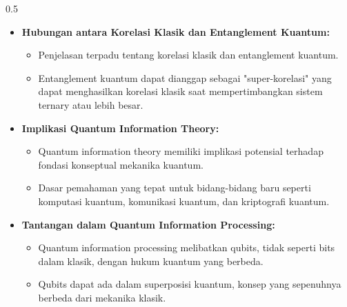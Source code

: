 \begin{frame}
\begin{columns}[T]
   \begin{column}{0.5\textwidth}
        \begin{itemize}\tiny \justifying
            \item \textbf{Hubungan antara Korelasi Klasik dan Entanglement Kuantum:}
            \begin{itemize}\tiny \justifying
            \item Penjelasan terpadu tentang korelasi klasik dan entanglement kuantum.
            \item Entanglement kuantum dapat dianggap sebagai "super-korelasi" yang dapat menghasilkan korelasi klasik saat mempertimbangkan sistem ternary atau lebih besar.
            \end{itemize}
            
            \item \textbf{Implikasi Quantum Information Theory:}
            \begin{itemize}\tiny \justifying
            \item Quantum information theory memiliki implikasi potensial terhadap fondasi konseptual mekanika kuantum.
            \item Dasar pemahaman yang tepat untuk bidang-bidang baru seperti komputasi kuantum, komunikasi kuantum, dan kriptografi kuantum.
            \end{itemize}
            
            \item \textbf{Tantangan dalam Quantum Information Processing:}
            \begin{itemize}\tiny \justifying
            \item Quantum information processing melibatkan qubits, tidak seperti bits dalam klasik, dengan hukum kuantum yang berbeda.
            \item Qubits dapat ada dalam superposisi kuantum, konsep yang sepenuhnya berbeda dari mekanika klasik.
            \end{itemize}
        \end{itemize}
    \end{column}
  \end{columns}   
\end{frame}

